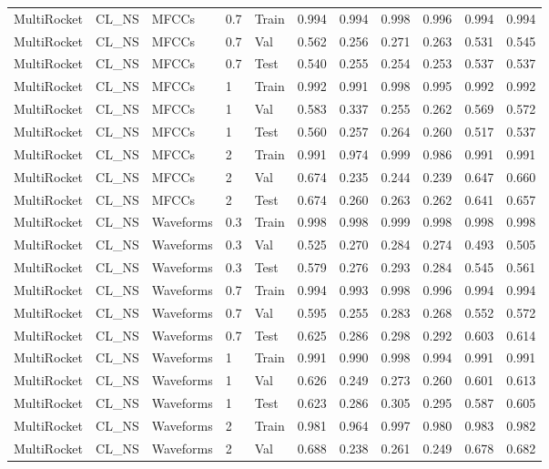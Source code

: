 \begin{landscape}
\begin{longtable}{|l|l|l|l|l|c|c|c|c|c|c|}
MultiRocket & CL\_NS & MFCCs & 0.7 & Train & 0.994 & 0.994 & 0.998 & 0.996 & 0.994 & 0.994 \\
MultiRocket & CL\_NS & MFCCs & 0.7 & Val & 0.562 & 0.256 & 0.271 & 0.263 & 0.531 & 0.545 \\
MultiRocket & CL\_NS & MFCCs & 0.7 & Test & 0.540 & 0.255 & 0.254 & 0.253 & 0.537 & 0.537 \\
MultiRocket & CL\_NS & MFCCs & 1 & Train & 0.992 & 0.991 & 0.998 & 0.995 & 0.992 & 0.992 \\
MultiRocket & CL\_NS & MFCCs & 1 & Val & 0.583 & 0.337 & 0.255 & 0.262 & 0.569 & 0.572 \\
MultiRocket & CL\_NS & MFCCs & 1 & Test & 0.560 & 0.257 & 0.264 & 0.260 & 0.517 & 0.537 \\
MultiRocket & CL\_NS & MFCCs & 2 & Train & 0.991 & 0.974 & 0.999 & 0.986 & 0.991 & 0.991 \\
MultiRocket & CL\_NS & MFCCs & 2 & Val & 0.674 & 0.235 & 0.244 & 0.239 & 0.647 & 0.660 \\
MultiRocket & CL\_NS & MFCCs & 2 & Test & 0.674 & 0.260 & 0.263 & 0.262 & 0.641 & 0.657 \\
MultiRocket & CL\_NS & Waveforms & 0.3 & Train & 0.998 & 0.998 & 0.999 & 0.998 & 0.998 & 0.998 \\
MultiRocket & CL\_NS & Waveforms & 0.3 & Val & 0.525 & 0.270 & 0.284 & 0.274 & 0.493 & 0.505 \\
MultiRocket & CL\_NS & Waveforms & 0.3 & Test & 0.579 & 0.276 & 0.293 & 0.284 & 0.545 & 0.561 \\
MultiRocket & CL\_NS & Waveforms & 0.7 & Train & 0.994 & 0.993 & 0.998 & 0.996 & 0.994 & 0.994 \\
MultiRocket & CL\_NS & Waveforms & 0.7 & Val & 0.595 & 0.255 & 0.283 & 0.268 & 0.552 & 0.572 \\
MultiRocket & CL\_NS & Waveforms & 0.7 & Test & 0.625 & 0.286 & 0.298 & 0.292 & 0.603 & 0.614 \\
MultiRocket & CL\_NS & Waveforms & 1 & Train & 0.991 & 0.990 & 0.998 & 0.994 & 0.991 & 0.991 \\
MultiRocket & CL\_NS & Waveforms & 1 & Val & 0.626 & 0.249 & 0.273 & 0.260 & 0.601 & 0.613 \\
MultiRocket & CL\_NS & Waveforms & 1 & Test & 0.623 & 0.286 & 0.305 & 0.295 & 0.587 & 0.605 \\
MultiRocket & CL\_NS & Waveforms & 2 & Train & 0.981 & 0.964 & 0.997 & 0.980 & 0.983 & 0.982 \\
MultiRocket & CL\_NS & Waveforms & 2 & Val & 0.688 & 0.238 & 0.261 & 0.249 & 0.678 & 0.682 \\

\end{longtable}
\end{landscape}
